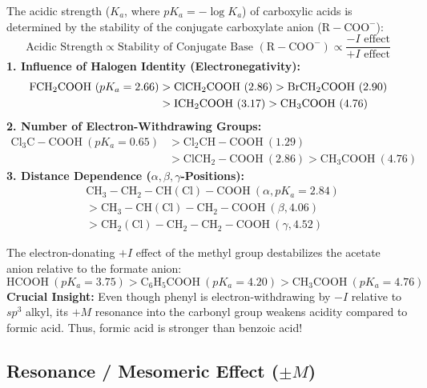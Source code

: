 \documentclass[10pt,twoside,openright]{book}
\begin{document}
\begin{usecasebox}
The acidic strength ($K_a$, where $pK_a = -\log K_a$) of carboxylic acids is determined by the stability of the conjugate carboxylate anion ($\mathrm{R-COO^-}$):
\begin{equation}
  \text{Acidic Strength} \propto \text{Stability of Conjugate Base } (\mathrm{R-COO^-}) \propto \frac{-I\text{ effect}}{+I\text{ effect}}
\end{equation}
\textbf{1. Influence of Halogen Identity (Electronegativity):}
\begin{align}
  \mathrm{FCH_2COOH} \ (pK_a = 2.66) &> \mathrm{ClCH_2COOH} \ (2.86) > \mathrm{BrCH_2COOH} \ (2.90) \notag \\
  &> \mathrm{ICH_2COOH} \ (3.17) > \mathrm{CH_3COOH} \ (4.76)
\end{align}
\textbf{2. Number of Electron-Withdrawing Groups:}
\begin{align}
  \mathrm{Cl_3C-COOH} \ (pK_a = 0.65) &> \mathrm{Cl_2CH-COOH} \ (1.29) \\
  &> \mathrm{ClCH_2-COOH} \ (2.86) > \mathrm{CH_3COOH} \ (4.76)
\end{align}
\textbf{3. Distance Dependence ($\alpha, \beta, \gamma$-Positions):}
\begin{align}
  &\mathrm{CH_3-CH_2-CH(Cl)-COOH} \ (\alpha, pK_a = 2.84) \\
  &> \mathrm{CH_3-CH(Cl)-CH_2-COOH} \ (\beta, 4.06) \\
  &> \mathrm{CH_2(Cl)-CH_2-CH_2-COOH} \ (\gamma, 4.52)
\end{align}
\end{usecasebox}

\begin{ncertbox}
The electron-donating $+I$ effect of the methyl group destabilizes the acetate anion relative to the formate anion:
\begin{equation}
  \mathrm{HCOOH} \ (pK_a = 3.75) > \mathrm{C_6H_5COOH} \ (pK_a = 4.20) > \mathrm{CH_3COOH} \ (pK_a = 4.76)
\end{equation}
\textbf{Crucial Insight:} Even though phenyl is electron-withdrawing by $-I$ relative to $sp^3$ alkyl, its $+M$ resonance into the carbonyl group weakens acidity compared to formic acid. Thus, formic acid is stronger than benzoic acid!
\end{ncertbox}

\subsection{Resonance / Mesomeric Effect (\texorpdfstring{$\pm M$}{+-M})}
\end{document}
